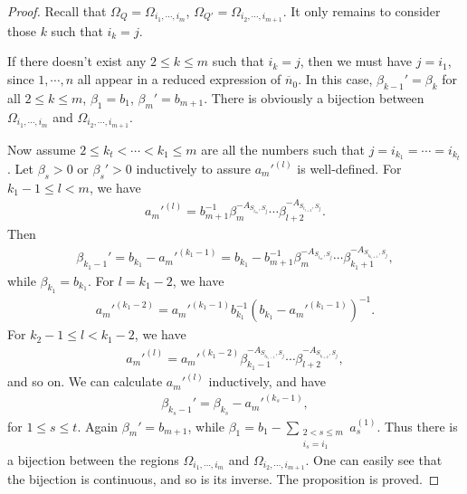 \documentclass[12pt]{amsart}
\begin{document}
\begin{proof}
    Recall that $\Omega_{Q}=\Omega_{i_1,\cdots,i_m}$, $\Omega_{Q'}=\Omega_{i_2,\cdots,i_{m+1}}$.
    It only remains to consider those $k$ such that $i_k=j$.

    If there doesn't exist any $2\leq k\leq m$ such that $i_k=j$, then we must have $j=i_1$, since $1,\cdots,n$ all appear in a reduced expression of $\overline{n}_0$.
    In this case, $\beta_{k-1}'=\beta_k$ for all $2\leq k\leq m$, $\beta_1=b_1$, $\beta_m'=b_{m+1}$.
    There is obviously a bijection between $\Omega_{i_1,\cdots,i_m}$ and $\Omega_{i_2,\cdots,i_{m+1}}$.

    Now assume $2\leq k_t < \cdots <k_1 \leq m$ are all the numbers such that $j=i_{k_1}=\cdots=i_{k_t}$.
    Let $\beta_s>0$ or $\beta_s'>0$ inductively to assure $ {a_m'}^{(l)}$ is well-defined.
    For $k_1-1\leq l<m$, we have 
    \begin{align*}
        {a_m'}^{(l)}=b_{m+1}^{-1}\beta_m^{-A_{S_{i_m},S_j}}\cdots \beta_{l+2}^{-A_{S_{i_{l+2}},S_j}}.
    \end{align*}
    Then
    \begin{align*}
    \beta_{k_1-1}'=b_{k_1}-{a_m'}^{(k_1-1)}=b_{k_1}-b_{m+1}^{-1}\beta_m^{-A_{S_{i_m},S_j}}\cdots \beta_{k_1+1}^{-A_{S_{i_{k_1+1}},S_j}},
    \end{align*}
    while $\beta_{k_1}=b_{k_1}$.
    For $l=k_1-2$, we have 
    \begin{align*}
        {a_m'}^{(k_1-2)}={a_m'}^{(k_1-1)} b_{k_1}^{-1}(b_{k_1}-{a_m'}^{(k_1-1)})^{-1}.
    \end{align*}
    For $k_2-1\leq l< k_1-2$, we have 
    \begin{align*}
        {a_m'}^{(l)}={a_m'}^{(k_1-2)}\beta_{k_1-1}^{-A_{S_{i_{k_1-1}},S_j}}\cdots \beta_{l+2}^{-A_{S_{i_{l+2}},S_j}},
    \end{align*}
    and so on. 
    We can calculate $ {a_m'}^{(l)}$ inductively, and have
    \begin{align*}
        \beta_{k_s-1}'=\beta_{k_s}- {a_m'}^{(k_s-1)},
    \end{align*}
    for $1\leq s \leq t$.
    Again $\beta_m'=b_{m+1}$, while $\beta_1=b_1-\sum_{\substack{2< s \leq m \\ i_s=i_1}} a_{s}^{(1)}$.
    Thus there is a bijection between the regions $\Omega_{i_1,\cdots,i_m}$ and $\Omega_{i_2,\cdots,i_{m+1}}$.
    One can easily see that the bijection is continuous, and so is its inverse.
    The proposition is proved.
\end{proof}
\end{document}
